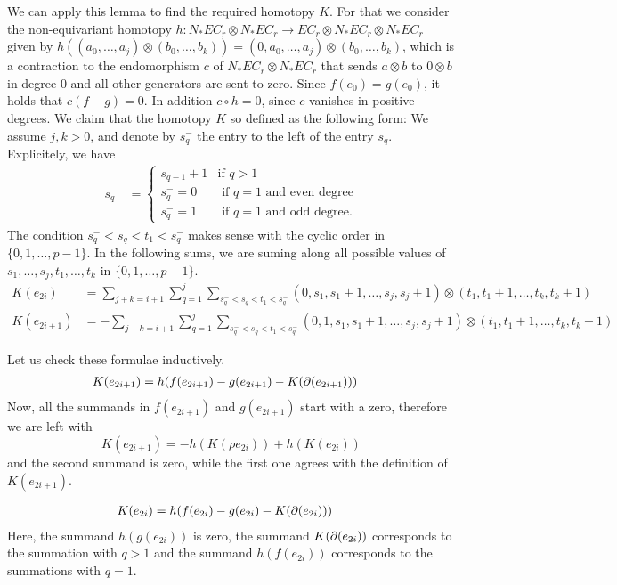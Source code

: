 We can apply this lemma to find the required homotopy $K$. For that we consider the non-equivariant homotopy $h\colon N_*EC_r\otimes N_*EC_r\to EC_r\otimes N_*EC_r\otimes N_*EC_r$ given by $h((a_0,\ldots,a_j)\otimes(b_0,\ldots,b_k)) = (0,a_0,\ldots,a_j)\otimes(b_0,\ldots,b_k)$, which is a contraction to the endomorphism $c$ of $N_*EC_r\otimes N_*EC_r$ that sends $a\otimes b$ to $0\otimes b$ in degree $0$ and all other generators are sent to zero. Since $f(e_0) = g(e_0)$, it holds that $c(f-g) = 0$. In addition $c\circ h = 0$, since $c$ vanishes in positive degrees. We claim that the homotopy $K$ so defined as the following form: We assume $j,k>0$, and denote by $s_q^-$ the entry to the left of the entry $s_q$. Explicitely, we have
\begin{align*}
	s_q^- &= \begin{cases}s_{q-1}+1 & \text{if $q>1$}\\
		s_q^- = 0 & \text{ if $q=1$ and even degree} \\
		s_q^- = 1 &\text{ if $q=1$ and odd degree.}
	\end{cases}
\end{align*}
The condition $s_q^-<s_q<t_1<s_q^-$ makes sense with the cyclic order in $\{0,1,\ldots,p-1\}$. In the following sums, we are suming along all possible values of $s_1,\ldots,s_j,t_1,\ldots,t_k$ in $\{0,1,\ldots,p-1\}$.
\begin{align*}
	K(e_{2i}) &= \sum_{j+k = i+1}{\sum_{q=1}^j{\sum_{s_q^-<s_q<t_1<s_q^-}{(0,s_1,s_1+1,\ldots,s_j,s_j+1)\otimes(t_1,t_1+1,\ldots,t_k,t_k+1)}}} \\
	K(e_{2i+1}) &= -\sum_{j+k = i+1}{\sum_{q=1}^j{\sum_{s_q^-<s_q<t_1<s_q^-}{(0,1,s_1,s_1+1,\ldots,s_j,s_j+1)\otimes(t_1,t_1+1,\ldots,t_k,t_k+1)}}}
\end{align*}

Let us check these formulae inductively.
\begin{align*}
	K(e_{2i+1}) &= h(f(e_{2i+1})-g(e_{2i+1})-K(\operatorname{\partial}(e_{2i+1})))
\end{align*}
Now, all the summands in $f(e_{2i+1})$ and $g(e_{2i+1})$ start with a zero, therefore we are left with
\[K(e_{2i+1}) = -h(K(\rho e_{2i}))+h(K(e_{2i}))\]
and the second summand is zero, while the first one agrees with the definition of $K(e_{2i+1})$.

\begin{align*}
	K(e_{2i}) &= h(f(e_{2i})-g(e_{2i})-K(\operatorname{\partial}(e_{2i})))
\end{align*}
Here, the summand $h(g(e_{2i}))$ is zero, the summand $K(\operatorname{\partial}(e_{2i}))$ corresponds to the summation with $q>1$ and the summand $h(f(e_{2i}))$ corresponds to the summations with $q=1$.


